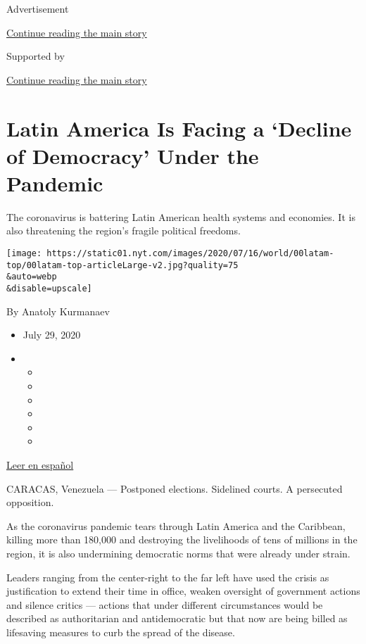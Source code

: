 Advertisement

\protect\hyperlink{after-top}{Continue reading the main story}

Supported by

\protect\hyperlink{after-sponsor}{Continue reading the main story}

\hypertarget{latin-america-is-facing-a-decline-of-democracy-under-the-pandemic}{%
\section{Latin America Is Facing a `Decline of Democracy' Under the
Pandemic}\label{latin-america-is-facing-a-decline-of-democracy-under-the-pandemic}}

The coronavirus is battering Latin American health systems and
economies. It is also threatening the region's fragile political
freedoms.

\texttt{[image: https://static01.nyt.com/images/2020/07/16/world/00latam-top/00latam-top-articleLarge-v2.jpg?quality=75\\\&auto=webp\\\&disable=upscale]}

By Anatoly Kurmanaev

\begin{itemize}
\item
  July 29, 2020
\item
  \begin{itemize}
  \item
  \item
  \item
  \item
  \item
  \item
  \end{itemize}
\end{itemize}

\href{https://www.nytimes.com/es/2020/07/29/espanol/america-latina/democracia-america-latina-pandemia.html}{Leer
en español}

CARACAS, Venezuela --- Postponed elections. Sidelined courts. A
persecuted opposition.

As the coronavirus pandemic tears through Latin America and the
Caribbean, killing more than 180,000 and destroying the livelihoods of
tens of millions in the region, it is also undermining democratic norms
that were already under strain.

Leaders ranging from the center-right to the far left have used the
crisis as justification to extend their time in office, weaken oversight
of government actions and silence critics --- actions that under
different circumstances would be described as authoritarian and
antidemocratic but that now are being billed as lifesaving measures to
curb the spread of the disease.

